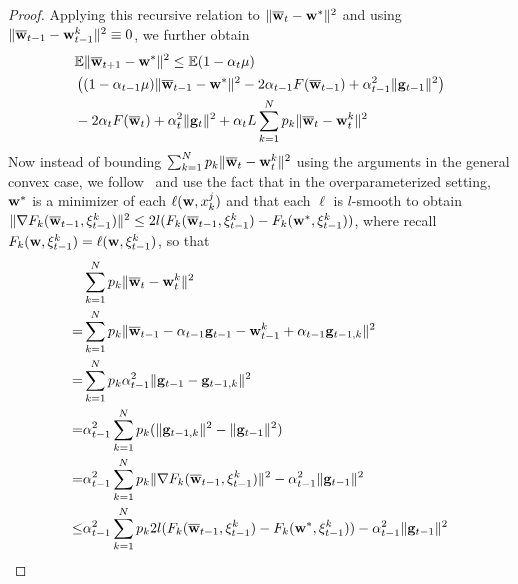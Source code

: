 \begin{proof}
	Applying this recursive relation to $\|{\overline{\mathbf{w}}}_{t}-{\mathbf{w}}^{\ast}\|^{2}$
	and using $\|{\overline{\mathbf{w}}}_{t-1}-{\mathbf{w}}_{t-1}^{k}\|^{2}\equiv0$, we further
	obtain 
	\begin{align*}
	& \mathbb{E}\|{\overline{\mathbf{w}}}_{t+1}-{\mathbf{w}}^{\ast}\|^{2}\leq \mathbb{E}(1-\alpha_{t}\mu)\\
	& \left((1-\alpha_{t-1}\mu)\|{\overline{\mathbf{w}}}_{t-1}-{\mathbf{w}}^{\ast}\|^{2}-2\alpha_{t-1}F({\overline{\mathbf{w}}}_{t-1})+\alpha_{t-1}^{2}\|{\mathbf{g}}_{t-1}\|^{2}\right)\\
	& -2\alpha_{t}F({\overline{\mathbf{w}}}_{t})+\alpha_{t}^{2}\|{\mathbf{g}}_{t}\|^{2}+\alpha_{t}L\sum_{k=1}^{N}p_{k}\|{\overline{\mathbf{w}}}_{t}-{\mathbf{w}}_{t}^{k}\|^{2}
	\end{align*}
	Now instead of bounding $\sum_{k=1}^{N}p_{k}\|{\overline{\mathbf{w}}}_{t}-{\mathbf{w}}_{t}^{k}\|^{2}$
	using the arguments in the general convex case, we follow~\cite{ma2017power} and use the fact that
	in the overparameterized setting, ${\mathbf{w}}^{\ast}$ is a minimizer of each
	$\ell({\mathbf{w}},x_{k}^{j})$ and that each $\ell$ is $l$-smooth to obtain
	$\|\nabla F_{k}({\overline{\mathbf{w}}}_{t-1},\xi_{t-1}^{k})\|^{2}\leq2l(F_{k}({\overline{\mathbf{w}}}_{t-1},\xi_{t-1}^{k})-F_{k}({\mathbf{w}}^{\ast},\xi_{t-1}^{k}))$,
	where recall $F_{k}({\mathbf{w}},\xi_{t-1}^{k})=\ell({\mathbf{w}},\xi_{t-1}^{k})$, so that
	\begin{align*}
	& \sum_{k=1}^{N}p_{k}\|{\overline{\mathbf{w}}}_{t}-{\mathbf{w}}_{t}^{k}\|^{2} \\
	 =&\sum_{k=1}^{N}p_{k}\|{\overline{\mathbf{w}}}_{t-1}-\alpha_{t-1}{\mathbf{g}}_{t-1}-{\mathbf{w}}_{t-1}^{k}+\alpha_{t-1}{\mathbf{g}}_{t-1,k}\|^{2}\\
	=&\sum_{k=1}^{N}p_{k}\alpha_{t-1}^{2}\|{\mathbf{g}}_{t-1}-{\mathbf{g}}_{t-1,k}\|^{2}\\
	=&\alpha_{t-1}^{2}\sum_{k=1}^{N}p_{k}(\|{\mathbf{g}}_{t-1,k}\|^{2}-\|{\mathbf{g}}_{t-1}\|^{2})\\
	=&\alpha_{t-1}^{2}\sum_{k=1}^{N}p_{k}\|\nabla F_{k}({\overline{\mathbf{w}}}_{t-1},\xi_{t-1}^{k})\|^{2}-\alpha_{t-1}^{2}\|{\mathbf{g}}_{t-1}\|^{2}\\
 \leq& \alpha_{t-1}^{2}\sum_{k=1}^{N}p_{k}2l(F_{k}({\overline{\mathbf{w}}}_{t-1},\xi_{t-1}^{k})-F_{k}({\mathbf{w}}^{\ast},\xi_{t-1}^{k}))-\alpha_{t-1}^{2}\|{\mathbf{g}}_{t-1}\|^{2}
	\end{align*}
	\begin{comment}
	(In the Nesterov case)
	\begin{align*}
	\mathbf{v}_{t+1}^{k} & =\mathbf{w}_{t}^{k}-\alpha_{t}\mathbf{g}_{t,k}\\
	\mathbf{w}_{t+1}^{k} & =\begin{cases}
	\mathbf{v}_{t+1}^{k}+\beta_{t}(\mathbf{v}_{t+1}^{k}-\mathbf{v}_{t}^{k}) & \text{if }t+1\notin\mathcal{I}_{E}\\
	\sum_{k=1}^{N}p_{k}\left[\mathbf{v}_{t+1}^{k}+\beta_{t}(\mathbf{v}_{t+1}^{k}-\mathbf{v}_{t}^{k})\right] & \text{if }t+1\in\mathcal{I}_{E}

\end{comment}
\end{proof}
